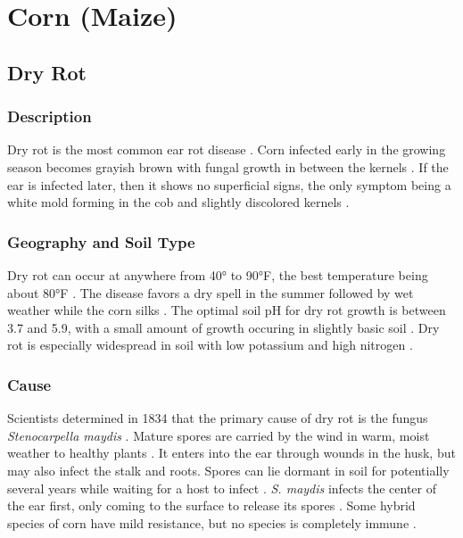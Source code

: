 \documentclass[12pt]{article}
\begin{document}
\section{Corn (Maize)}

\subsection{Dry Rot}

\subsubsection{Description}

Dry rot is the most common ear rot disease \autocite{ullstrup1961corn}. Corn infected early in the growing season becomes grayish brown with fungal growth in between the kernels \autocite{ullstrup1961corn}. If the ear is infected later, then it shows no superficial signs, the only symptom being a white mold forming in the cob and slightly discolored kernels \autocite{ullstrup1961corn}.

\subsubsection{Geography and Soil Type}

Dry rot can occur at anywhere from 40° to 90°F, the best temperature being about 80°F \autocite{melhus1922dry}. The disease favors a dry spell in the summer followed by wet weather while the corn silks \autocite{ullstrup1961corn, melhus1922dry}. The optimal soil pH for dry rot growth is between 3.7 and 5.9, with a small amount of growth occuring in slightly basic soil \autocite{eddins1930dry}. Dry rot is especially widespread in soil with low potassium and high nitrogen \autocite{ullstrup1961corn}.

\subsubsection{Cause}

Scientists determined in 1834 that the primary cause of dry rot is the fungus \emph{Stenocarpella maydis} \autocite{durrell1923dry, ullstrup1961corn}. Mature spores are carried by the wind in warm, moist weather to healthy plants \autocite{ullstrup1961corn}. It enters into the ear through wounds in the husk, but may also infect the stalk and roots. Spores can lie dormant in soil for potentially several years while waiting for a host to infect \autocite{eddins1930dry}. \emph{S. maydis} infects the center of the ear first, only coming to the surface to release its spores \autocite{melhus1922dry}. Some hybrid species of corn have mild resistance, but no species is completely immune \autocite{ullstrup1961corn}.
\end{document}
